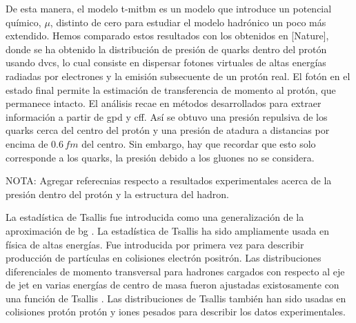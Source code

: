 De esta manera, el modelo \acrshort{t-mitbm} es un modelo que introduce un potencial químico, $\mu$, distinto de cero para estudiar el modelo hadrónico un poco más extendido. Hemos comparado estos resultados con los obtenidos en [Nature], donde se ha obtenido la distribución de presión de quarks dentro del protón usando \acrfull{dvcs}, lo cual consiste en dispersar fotones virtuales de altas energías radiadas por electrones y la emisión subsecuente de un protón real. El fotón en el estado final permite la estimación de transferencia de momento al protón, que permanece intacto. El análisis recae en métodos desarrollados para extraer información a partir de \acrfull{gpd} y \acrfull{cff}. Así se obtuvo una presión repulsiva de los quarks cerca del centro del protón y una presión de atadura a distancias por encima de $0.6 \, \mathit{fm}$ del centro. Sin embargo, hay que recordar que esto solo corresponde a los quarks, la presión debido a los gluones no se considera.

NOTA: Agregar referecnias respecto a resultados experimentales acerca de la presión dentro del protón y la estructura del hadron.


La estadística de Tsallis fue introducida como una generalización de la aproximación de \acrshort{bg} \cite{Tsallis1988,Beck_2003,Tsallis2009,Tsallis_2014,Tsallis_2009}. La estadística de Tsallis ha sido ampliamente usada en física de altas energías. Fue introducida por primera vez para describir producción de partículas en colisiones electrón positrón. Las distribuciones diferenciales de momento transversal para hadrones cargados con respecto al eje de jet en varias energías de centro de masa fueron ajustadas existosamente con una función de Tsallis \cite{Bediaga_2000,Collaboration1984}. Las distribuciones de Tsallis también han sido usadas en colisiones protón protón\cite{PhysRevLett.105.022002,Marques_2015,Bhattacharyya_2018,Khuntia_2017} y iones pesados \cite{Saraswat_2018,Saraswat_2017}
 para describir los datos experimentales.

